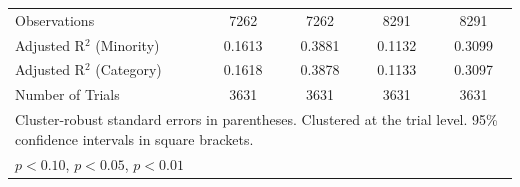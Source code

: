 \begin{table}[p]
{\begin{tabular}{l*{4}{c}}
\midrule
Observations      &7262&7262&8291&8291\\
Adjusted R$^2$ (Minority)      &0.1613&0.3881&0.1132&0.3099\\
Adjusted R$^2$ (Category)      &0.1618&0.3878&0.1133&0.3097\\
Number of Trials      &3631&3631&3631&3631\\
\bottomrule
\multicolumn{5}{l}{\footnotesize Cluster-robust standard errors in parentheses. Clustered at the trial level. 95\% confidence intervals in square brackets.}\\
\multicolumn{5}{l}{\footnotesize \sym{*} \(p<0.10\), \sym{**} \(p<0.05\), \sym{***} \(p<0.01\)}\\
\end{tabular}
}
\end{table}

